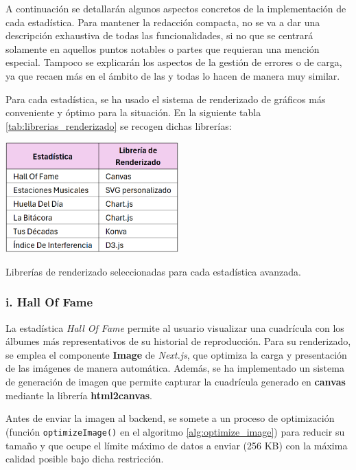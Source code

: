 A continuación se detallarán algunos aspectos concretos de la implementación de cada estadística. Para mantener la redacción compacta, no se va a dar una descripción exhaustiva de todas las funcionalidades, si no que se centrará solamente en aquellos puntos notables o partes que requieran una mención especial. Tampoco se explicarán los aspectos de la gestión de errores o de carga, ya que recaen más en el ámbito de las  y todas lo hacen de manera muy similar.

Para cada estadística, se ha usado el sistema de renderizado de gráficos más conveniente y óptimo para la situación. En la siguiente tabla \ref{tab:librerias_renderizado} se recogen dichas librerías:

\begin{table}[htbp]
    \centering
    \includegraphics[width=0.5\textwidth]{figures/implementacion/librerias_renderizado.png}
    \captionsetup{skip=5pt}
    \caption{Librerías de renderizado seleccionadas para cada estadística avanzada.}
    \label{tab:librerias_renderizado}
\end{table}

\subsubsection*{i. Hall Of Fame}

La estadística \textit{Hall Of Fame} permite al usuario visualizar una cuadrícula con los álbumes más representativos de su historial de reproducción. Para su renderizado, se emplea el componente \textbf{Image} de \textit{Next.js}, que optimiza la carga y presentación de las imágenes de manera automática. Además, se ha implementado un sistema de generación de imagen que permite capturar la cuadrícula generado en \textbf{canvas} mediante la librería \textbf{html2canvas}.

\newpage

Antes de enviar la imagen al backend, se somete a un proceso de optimización (función \texttt{optimizeImage()} en el algoritmo \ref{alg:optimize_image}) para reducir su tamaño y que ocupe el límite máximo de datos a enviar (256 KB) con la máxima calidad posible bajo dicha restricción.

